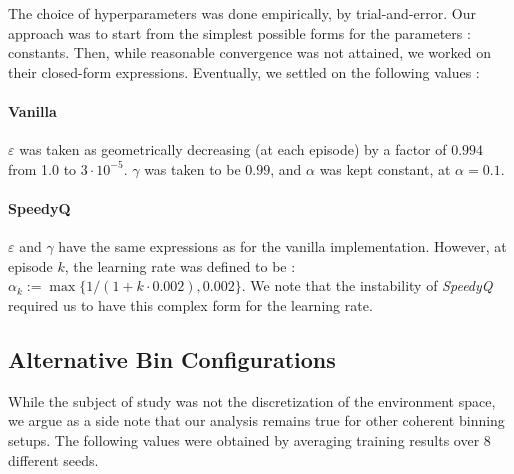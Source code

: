 \documentclass[10pt,conference,compsocconf]{IEEEtran}
\begin{document}
       The choice of hyperparameters was done empirically, by trial-and-error. Our approach was to start from the simplest possible forms for the parameters : constants. Then, while reasonable convergence was not attained, we worked on their closed-form expressions. Eventually, we settled on the following values :

       \paragraph{Vanilla}
       $\varepsilon$ was taken as geometrically decreasing (at each episode) by a factor of $0.994$ from 1.0 to $3 \cdot 10^{-5}$. $\gamma$ was taken to be $0.99$, and $\alpha$ was kept constant, at $\alpha = 0.1$.

       \paragraph{SpeedyQ}
       $\varepsilon$ and $\gamma$ have the same expressions as for the vanilla implementation. However, at episode $k$, the learning rate was defined to be : $\alpha_k := \max \{1 / (1 + k \cdot 0.002), 0.002\}$. We note that the instability of \textit{SpeedyQ} required us to have this complex form for the learning rate.
    
        \subsection{Alternative Bin Configurations}
    
         While the subject of study was not the discretization of the environment space, we argue as a side note that our analysis remains true for other coherent binning setups. The following values were obtained by averaging training results over 8 different seeds.
        
\end{document}
